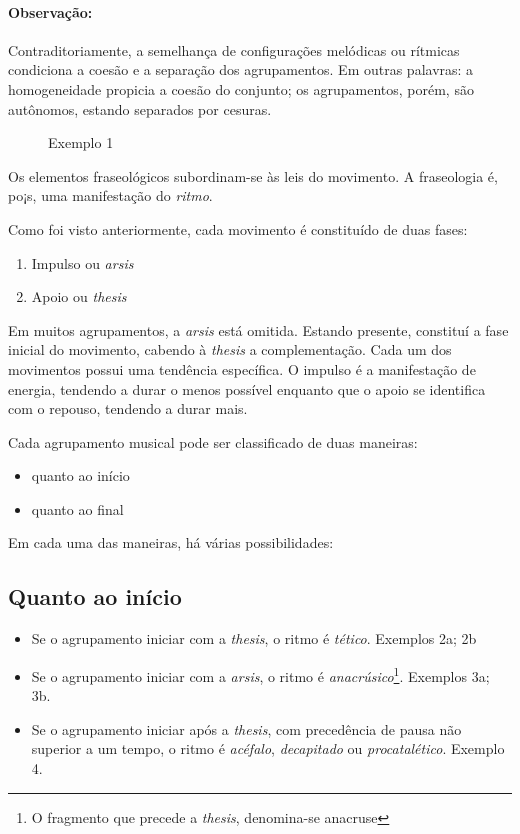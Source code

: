 \documentclass[a4paper]{book}
\begin{document}
\paragraph{Observação:} Contraditoriamente, a semelhança de configurações melódicas ou rítmicas condiciona a coesão e a separação dos agrupamentos. Em outras palavras: a homogeneidade propicia a coesão do conjunto; os agrupamentos, porém, são autônomos, estando separados por cesuras.

\begin{figure}
\caption{Exemplo 1}
\end{figure}

Os elementos fraseológicos subordinam-se às leis do movimento. A fraseologia é, po¡s, uma manifestação do \textit{ritmo}.

Como foi visto anteriormente, cada movimento é constituído de duas fases:

\begin{enumerate}[label=\emph{\alph*})]
\item Impulso ou \textit{arsis}
\item Apoio ou \textit{thesis}
\end{enumerate}

Em muitos agrupamentos, a \textit{arsis} está omitida. Estando presente, constituí a fase inicial do movimento, cabendo à \textit{thesis} a complementação. Cada um dos movimentos possui uma tendência específica. O impulso é a manifestação de energia, tendendo a durar o menos possível enquanto que o apoio se identifica com o repouso, tendendo a durar mais.

Cada agrupamento musical pode ser classificado de duas maneiras:
\begin{itemize}
\item quanto ao início
\item quanto ao final
\end{itemize}

Em cada uma das maneiras, há várias possibilidades:

\subsection*{Quanto ao início}
\begin{itemize}
\item Se o agrupamento iniciar com a \textit{thesis}, o ritmo é \emph{tético}. Exemplos 2a; 2b
\item Se o agrupamento iniciar com a \textit{arsis}, o ritmo é \emph{anacrúsico}\footnote{O fragmento que precede a \textit{thesis}, denomina-se anacruse}. Exemplos 3a; 3b.
\item Se o agrupamento iniciar após a \textit{thesis}, com precedência de pausa não superior a um tempo, o ritmo é \emph{acéfalo}, \emph{decapitado} ou \emph{procatalético}. Exemplo 4.
\end{itemize}
\end{document}

